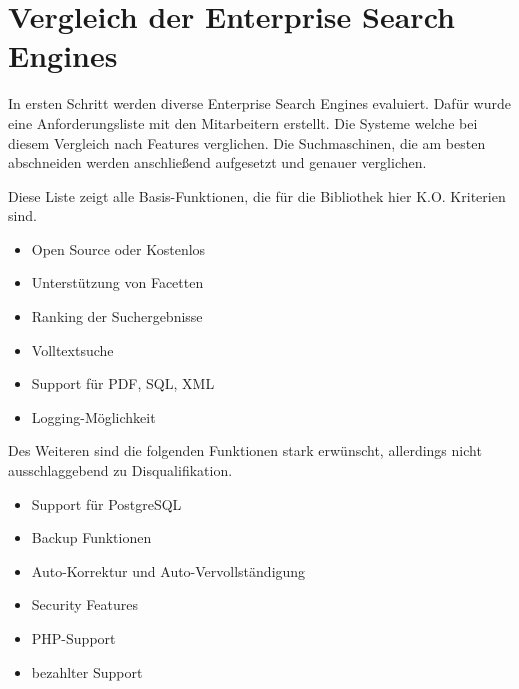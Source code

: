 \chapter{Vergleich der Enterprise Search Engines}

In ersten Schritt werden diverse Enterprise Search Engines evaluiert. Dafür wurde eine Anforderungsliste mit den Mitarbeitern erstellt. Die Systeme welche bei diesem Vergleich nach Features verglichen. Die Suchmaschinen, die am besten abschneiden werden anschließend aufgesetzt und genauer verglichen.

Diese Liste zeigt alle Basis-Funktionen, die für die Bibliothek hier K.O. Kriterien sind.
\begin{itemize}
    \item Open Source oder Kostenlos
    \item Unterstützung von Facetten
    \item Ranking der Suchergebnisse
    \item Volltextsuche
    \item Support für PDF, SQL, XML
    \item Logging-Möglichkeit
\end{itemize}

Des Weiteren sind die folgenden Funktionen stark erwünscht, allerdings nicht ausschlaggebend zu Disqualifikation.

\begin{itemize}
    \item Support für PostgreSQL
    \item Backup Funktionen
    \item Auto-Korrektur und Auto-Vervollständigung
    \item Security Features
    \item PHP-Support
    \item bezahlter Support
\end{itemize}

